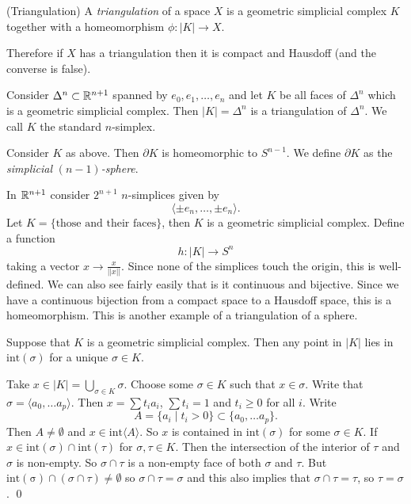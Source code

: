 \documentclass{article}
\begin{document}
\begin{definition}
	(Triangulation) A \textit{triangulation} of a space $ X $ is a geometric simplicial complex $ K $ together with a homeomorphism $ \phi: |K| \to X $.
\end{definition}
Therefore if $ X $ has a triangulation then it is compact and Hausdoff (and the converse is false).
\begin{example}
	Consider $ \Delta^n \subset \mathbb{R}^{n+1} $ spanned by $ e_0,e_1,\dots, e_{n} $ and let $ K $ be all faces of $ \Delta^n $ which is a geometric simplicial complex. Then $ |K| = \Delta^n $ is a triangulation of $ \Delta^n $. We call $ K $ the standard $ n $-simplex.
\end{example}
\begin{example}
	Consider $ K $ as above. Then $ \partial K $ is homeomorphic to $ S^{n-1} $. We define $ \partial K $ as the \textit{simplicial} $ (n-1) $\textit{-sphere}.
\end{example}
\begin{example}
	In $ \mathbb{R}^{n+1} $ consider $ 2^{n+1} $ $ n $-simplices given by
	\[
	  \langle \pm e_n, \dots, \pm e_n\rangle.
	\]
	Let $ K = \{\text{those and their faces}\} $, then $ K $ is a geometric simplicial complex. Define a function
\[
  h: |K| \to S^n 
\]
taking a vector $ x \longrightarrow \frac x{||x||} $. Since none of the simplices touch the origin, this is well-defined. We can also see fairly easily that is it continuous and bijective. Since we have a continuous bijection from a compact space to a Hausdoff space, this is a homeomorphism. This is another example of a triangulation of a sphere.
\end{example}
\begin{lemma}
	Suppose that $ K $ is a geometric simplicial complex. Then any point in $ |K| $ lies in $ \mathrm{int}(\sigma) $ for a unique $ \sigma\in K $.
\end{lemma}
\pf Take $ x\in |K| = \bigcup_{\sigma\in K}\sigma $. Choose some $ \sigma\in K $ such that $ x\in \sigma $. Write that $ \sigma = \langle a_0,\dots a_p\rangle $. Then $ x = \sum t_ia_i $, $ \sum t_i = 1 $ and $ t_i \ge 0 $ for all $ i $. Write 
\[
A = \{ a_i \mid t_i > 0 \} \subset \{a_0,\dots a_p\}.
\]
Then $ A \ne \emptyset $ and $ x\in \mathrm{int}\langle A \rangle $. So $ x $ is contained in $ \mathrm{int}(\sigma) $ for some $ \sigma\in K $. If $ x\in \mathrm{int}(\sigma)\cap\mathrm{int}(\tau) $ for $ \sigma,\tau\in K $. Then the intersection of the interior of $ \tau $ and $ \sigma $ is non-empty. So $ \sigma\cap \tau $ is a non-empty face of both $ \sigma $ and $ \tau $. But $ \mathrm{int(\sigma)}\cap (\sigma\cap \tau)\ne \emptyset $ so $ \sigma\cap\tau = \sigma $ and this also implies that $ \sigma\cap \tau = \tau $, so $ \tau = \sigma $. \qed 
\end{document}
